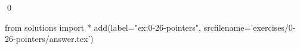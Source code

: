 
\begin{ex}
  \label{ex:0-26-pointers}
  
  \qed
\end{ex}
\begin{python0}
from solutions import *
add(label="ex:0-26-pointers",
    srcfilename='exercises/0-26-pointers/answer.tex')
\end{python0}
